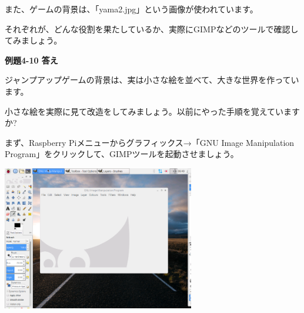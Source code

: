 \documentclass[a4paper,dvipdfmx]{jarticle}
\begin{document}
\bigskip


\bigskip


\bigskip


\bigskip


\bigskip


\bigskip


\bigskip


\bigskip


\bigskip

また、ゲームの背景は、「yama2.jpg」という画像が使われています。

それぞれが、どんな役割を果たしているか、実際にGIMPなどのツールで確認してみましょう。


\bigskip


\bigskip

{\bfseries
例題4-10 答え}


\bigskip

ジャンプアップゲームの背景は、実は小さな絵を並べて、大きな世界を作っています。

小さな絵を実際に見て改造をしてみましょう。以前にやった手順を覚えていますか?

まず、Raspberry
Piメニューからグラフィックス→「GNU Image
Manipulation
Program」をクリックして、GIMPツールを起動させましょう。



\begin{center}
\includegraphics[width=8.398cm,height=6.297cm]{text04-img/text04-img028.png}

\end{center}

\bigskip


\bigskip


\bigskip


\bigskip


\bigskip


\bigskip


\bigskip
\end{document}
